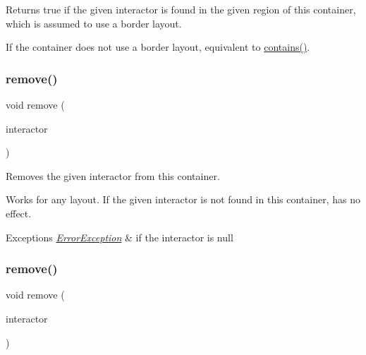 Returns true if the given interactor is found in the given region of this container, which is assumed to use a border layout. 

If the container does not use a border layout, equivalent to \mbox{\hyperlink{classGContainer_a29e67f98cd36414c67475b8941d861a6}{contains()}}. \mbox{\label{classGContainer_a1c12b1fde5c2ef10d79d4ee51e670efa}} 
\subsubsection{\texorpdfstring{remove()}{remove()}\hspace{0.1cm}{\footnotesize\ttfamily [1/3]}}
{\footnotesize\ttfamily void remove (\begin{DoxyParamCaption}\item[{\mbox{\hyperlink{classGInteractor}{G\+Interactor}} $\ast$}]{interactor }\end{DoxyParamCaption})\hspace{0.3cm}{\ttfamily [virtual]}}



Removes the given interactor from this container. 

Works for any layout. If the given interactor is not found in this container, has no effect. 
\begin{DoxyExceptions}{Exceptions}
{\em \mbox{\hyperlink{classErrorException}{Error\+Exception}}} & if the interactor is null \\
\hline
\end{DoxyExceptions}
\mbox{\label{classGContainer_ade2376c458ac401a0bd2dbe44271509e}} 
\subsubsection{\texorpdfstring{remove()}{remove()}\hspace{0.1cm}{\footnotesize\ttfamily [2/3]}}
{\footnotesize\ttfamily void remove (\begin{DoxyParamCaption}\item[{\mbox{\hyperlink{classGInteractor}{G\+Interactor}} \&}]{interactor }\end{DoxyParamCaption})\hspace{0.3cm}{\ttfamily [virtual]}}



